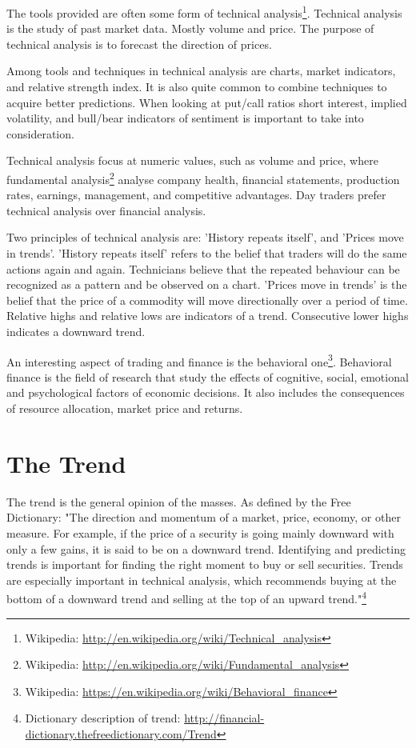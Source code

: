The tools provided are often some form of technical analysis\footnote{Wikipedia:
\url{http://en.wikipedia.org/wiki/Technical_analysis}}. Technical analysis is
the study of past market data. Mostly volume and price. The purpose of technical
analysis is to forecast the direction of prices.  

Among tools and techniques in technical analysis are charts, market indicators,
and relative strength index. It is also quite common to combine techniques to
acquire better predictions. When looking at put/call ratios short interest,
implied volatility, and bull/bear indicators of sentiment is important to take into consideration. 

Technical analysis focus at numeric values, such as volume and price, where fundamental analysis\footnote{Wikipedia:
\url{http://en.wikipedia.org/wiki/Fundamental_analysis}} analyse company health,
financial statements, production rates, earnings, management, and competitive
advantages. Day traders prefer technical analysis over
financial analysis.   

Two principles of technical analysis are: 'History repeats itself', and
'Prices move in trends'. 'History repeats itself' refers to the belief that
traders will do the same actions again and again. Technicians believe that the
repeated behaviour can be recognized as a pattern and be observed on a chart.
'Prices move in trends' is the belief that the price of a commodity will move
directionally over a period of time. Relative highs and relative lows are
indicators of a trend. Consecutive lower highs indicates a downward trend.  

An interesting aspect of trading and finance is the behavioral
one\footnote{Wikipedia:
\url{https://en.wikipedia.org/wiki/Behavioral_finance}}.
Behavioral finance is the field of research that study the effects of
cognitive, social, emotional and psychological factors of economic decisions. It
also includes the consequences of resource allocation, market price and
returns. 
%

\section{The Trend}\label{previous_work:trends}
The trend is the general opinion of the masses. As defined by the Free
Dictionary:  
"The direction and momentum of a market, price, economy, or other measure. For
example, if the price of a security is going mainly downward with only a few
gains, it is said to be on a downward trend. Identifying and
predicting trends is important for finding the right moment to buy or sell
securities. Trends are especially important in technical analysis, which
recommends buying at the bottom of a downward trend and selling at the top of an
upward trend."\footnote{Dictionary description of trend: \url{http://financial-dictionary.thefreedictionary.com/Trend}}

